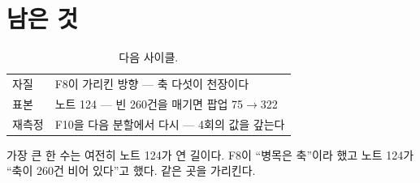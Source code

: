 \documentclass[10pt]{article}
\begin{document}
\section{남은 것}

\begin{table}[t]
\centering\tsize
\caption{다음 사이클.}
\begin{tabular}{ll}
\toprule
자질 & F8이 가리킨 방향 --- 축 다섯이 천장이다 \\
표본 & 노트 124 --- 빈 260건을 매기면 팝업 75$\to$322 \\
재측정 & F10을 다음 분할에서 다시 --- 4회의 값을 갚는다 \\
\bottomrule
\end{tabular}
\end{table}

가장 큰 한 수는 여전히 노트 124가 연 길이다. F8이 ``병목은 축''이라 했고
노트 124가 ``축이 260건 비어 있다''고 했다. 같은 곳을 가리킨다.
\end{document}

